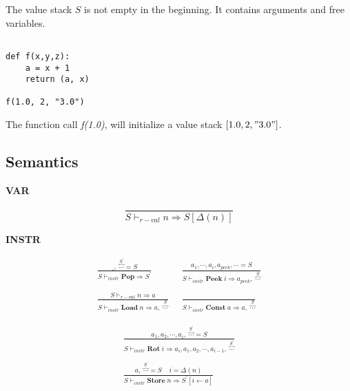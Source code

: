 \documentclass[12pt, a4paper]{report}
\newcommand{\rulegroup}[1]{
    \textbf{#1}
}
\begin{document}
The value stack $S$ is not empty in the beginning. It contains arguments and free variables.

\begin{lstlisting}

def f(x,y,z):
    a = x + 1
    return (a, x)

f(1.0, 2, "3.0")

\end{lstlisting}
The function call \textit{f(1.0)}, will initialize a value stack $[1.0, 2, "3.0"]$.

\subsection*{Semantics}


\hrulefill

\rulegroup{VAR}

\begin{equation*}
\frac{}{S \vdash_{r-val} n \Rightarrow S[\Delta(n)]}
\end{equation*}    

\hrulefill
\bigbreak

\rulegroup{INSTR}

\begin{equation*}
\begin{split}
\frac{
    \_ , \; \overbrace{\cdots}^{S^{'}} = S
}{
    S \vdash_{instr} \mathbf{Pop} \Rightarrow S^{'}
}
\;\;
& \frac{
    a_1, \cdots, a_i, a_{peek}, \cdots = S
}{
    S \vdash_{instr} \mathbf{Peek}\; i \Rightarrow a_{peek}, \; \overbrace{\cdots}^{S}
}
\\\\
\frac{S \vdash_{r-val} n \Rightarrow a}
     {S \vdash_{instr} \mathbf{Load}\; n \Rightarrow a, \; \overbrace{\cdots}^{S} }
\;\;
& \frac{}
     {S \vdash_{instr} \mathbf{Const}\; a \Rightarrow a, \; \overbrace{\cdots}^{S}}
\end{split}
\end{equation*}

\begin{equation*}
\begin{split}
\frac{
    a_1, a_2, \cdots, a_i, \; \overbrace{\cdots}^{S^{'}} = S
}{
    S \vdash_{instr} \mathbf{Rot} \; i \Rightarrow a_i, a_1, a_2, \cdots, a_{i - 1},\; \overbrace{\cdots}^{S^{'}}
}
\\\\
\frac{ a,\; \overbrace{\cdots}^{S^{'}} = S \;\;\;\; i = \Delta(n) }
        { S \vdash_{instr} \mathbf{Store} \; n \Rightarrow S^{'}[i \leftarrow a]}
\end{split}
\end{equation*}
\end{document}
